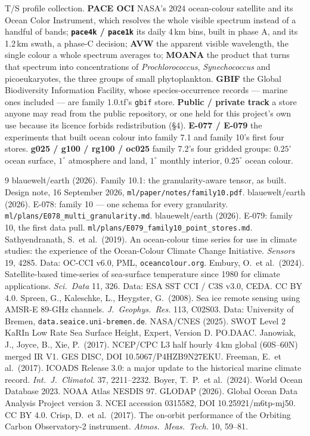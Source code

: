 \documentclass[10pt]{article}
\newcommand{\code}[1]{\texttt{#1}}
\begin{document}
T/S profile collection. \textbf{PACE OCI} NASA's 2024 ocean-colour satellite and its Ocean Color Instrument, which resolves the whole visible spectrum instead of a handful of bands; \textbf{\code{pace4k} / \code{pace1k}} its daily 4\,km bins, built in phase A, and its 1.2\,km swath, a phase-C decision; \textbf{AVW} the apparent visible wavelength, the single colour a whole spectrum averages to; \textbf{MOANA} the product that turns that spectrum into concentrations of \emph{Prochlorococcus}, \emph{Synechococcus} and picoeukaryotes, the three groups of small phytoplankton. \textbf{GBIF} the Global Biodiversity Information Facility, whose species-occurrence records --- marine ones included --- are family 1.0.tf's \code{gbif} store. \textbf{Public / private track} a store anyone may read from the public repository, or one held for this project's own use because its licence forbids redistribution (\S4). \textbf{E-077 / E-079} the experiments that built ocean colour into family 7.1 and family 10's first four stores. \textbf{g025 / g100 / rg100 / oc025} family 7.2's four gridded groups: $0.25^\circ$ ocean surface, $1^\circ$ atmosphere and land, $1^\circ$ monthly interior, $0.25^\circ$ ocean colour.
\normalsize

\begin{thebibliography}{9}\small
{} blauewelt/earth (2026). Family 10.1: the granularity-aware
tensor, as built. Design note, 16 September 2026, \code{ml/paper/notes/family10.pdf}.
 blauewelt/earth (2026). E-078: family 10 --- one schema for
every granularity. \code{ml/plans/E078\_multi\_granularity.md}.
 blauewelt/earth (2026). E-079: family 10, the first data pull.
\code{ml/plans/E079\_family10\_point\_stores.md}.
 Sathyendranath, S.\ et al.\ (2019). An ocean-colour time series
for use in climate studies: the experience of the Ocean-Colour Climate Change
Initiative. \emph{Sensors} 19, 4285. Data: OC-CCI v6.0, PML, \code{oceancolour.org}.
 Embury, O.\ et al.\ (2024). Satellite-based time-series of
sea-surface temperature since 1980 for climate applications. \emph{Sci.\ Data}
11, 326. Data: ESA SST CCI / C3S v3.0, CEDA. CC BY 4.0.
 Spreen, G., Kaleschke, L., Heygster, G.\ (2008). Sea ice remote
sensing using AMSR-E 89-GHz channels. \emph{J.\ Geophys.\ Res.} 113, C02S03.
Data: University of Bremen, \code{data.seaice.uni-bremen.de}.
 NASA/CNES (2025). SWOT Level 2 KaRIn Low Rate Sea Surface Height,
Expert, Version D. PO.DAAC.
 Janowiak, J., Joyce, B., Xie, P.\ (2017). NCEP/CPC L3 half
hourly 4\,km global (60S--60N) merged IR V1. GES DISC, DOI 10.5067/P4HZB9N27EKU.
 Freeman, E.\ et al.\ (2017). ICOADS Release 3.0: a major
update to the historical marine climate record. \emph{Int.\ J.\ Climatol.} 37,
2211--2232.
 Boyer, T.\ P.\ et al.\ (2024). World Ocean Database 2023. NOAA
Atlas NESDIS 97.
 GLODAP (2026). Global Ocean Data Analysis Project version 3.
NCEI accession 0315582, DOI 10.25921/m6tp-mj50. CC BY 4.0.
 Crisp, D.\ et al.\ (2017). The on-orbit performance of the
Orbiting Carbon Observatory-2 instrument. \emph{Atmos.\ Meas.\ Tech.} 10, 59--81.
\end{thebibliography}
\end{document}
